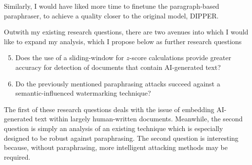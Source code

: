 \documentclass{l4proj}
\theoremstyle{definition}
\begin{document}
    Similarly, I would have liked more time to finetune the paragraph-based paraphraser, to achieve a quality closer to the original model, DIPPER.
    
    Outwith my existing research questions, there are two avenues into which I would like to expand my analysis, which I propose below as further research questions
    \begin{enumerate}[label={\textbf{RQ\arabic*}:}, leftmargin=4em]
        \setcounter{enumi}{4}
        \item Does the use of a sliding-window for $z$-score calculations provide greater accuracy for detection of documents that contain AI-generated text? 
        \item Do the previously mentioned paraphrasing attacks succeed against a semantic-influenced watermarking technique?
    \end{enumerate}

    The first of these research questions deals with the issue of embedding AI-generated text within largely human-written documents. Meanwhile, the second question is simply an analysis of an existing technique which is especially designed to be robust against paraphrasing. The second question is interesting because, without paraphrasing, more intelligent attacking methods may be required.


\end{document}
